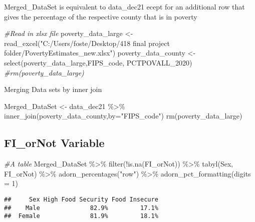 \documentclass[
]{article}
\newenvironment{Shaded}{\begin{snugshade}}{\end{snugshade}}
\newcommand{\AttributeTok}[1]{\textcolor[rgb]{0.77,0.63,0.00}{#1}}
\newcommand{\CommentTok}[1]{\textcolor[rgb]{0.56,0.35,0.01}{\textit{#1}}}
\newcommand{\DecValTok}[1]{\textcolor[rgb]{0.00,0.00,0.81}{#1}}
\newcommand{\FunctionTok}[1]{\textcolor[rgb]{0.00,0.00,0.00}{#1}}
\newcommand{\NormalTok}[1]{#1}
\newcommand{\OtherTok}[1]{\textcolor[rgb]{0.56,0.35,0.01}{#1}}
\newcommand{\SpecialCharTok}[1]{\textcolor[rgb]{0.00,0.00,0.00}{#1}}
\newcommand{\StringTok}[1]{\textcolor[rgb]{0.31,0.60,0.02}{#1}}
\begin{document}
Merged\_DataSet is equivalent to data\_dec21 ecept for an additional row
that gives the percentage of the respective county that is in poverty

\begin{Shaded}
\begin{Highlighting}[]
\CommentTok{\#Read in xlsx file}
\NormalTok{poverty\_data\_large }\OtherTok{\textless{}{-}} \FunctionTok{read\_excel}\NormalTok{(}\StringTok{"C:/Users/foste/Desktop/418 final project folder/PovertyEstimates\_new.xlsx"}\NormalTok{)}
\NormalTok{poverty\_data\_county }\OtherTok{\textless{}{-}} \FunctionTok{select}\NormalTok{(poverty\_data\_large,FIPS\_code, PCTPOVALL\_2020)}
\CommentTok{\#rm(poverty\_data\_large)}
\end{Highlighting}
\end{Shaded}

Merging Data sets by inner join

\begin{Shaded}
\begin{Highlighting}[]
\NormalTok{Merged\_DataSet }\OtherTok{\textless{}{-}}\NormalTok{  data\_dec21 }\SpecialCharTok{\%\textgreater{}\%} \FunctionTok{inner\_join}\NormalTok{(poverty\_data\_county,}\AttributeTok{by=}\StringTok{"FIPS\_code"}\NormalTok{)}
\FunctionTok{rm}\NormalTok{(poverty\_data\_large)}
\end{Highlighting}
\end{Shaded}

\hypertarget{fi_ornot-variable}{%
\subsection{FI\_orNot Variable}\label{fi_ornot-variable}}

\begin{Shaded}
\begin{Highlighting}[]
\CommentTok{\#A table }
\NormalTok{Merged\_DataSet }\SpecialCharTok{\%\textgreater{}\%} \FunctionTok{filter}\NormalTok{(}\SpecialCharTok{!}\FunctionTok{is.na}\NormalTok{(FI\_orNot)) }\SpecialCharTok{\%\textgreater{}\%} 
\FunctionTok{tabyl}\NormalTok{(Sex, FI\_orNot) }\SpecialCharTok{\%\textgreater{}\%} 
  \FunctionTok{adorn\_percentages}\NormalTok{(}\StringTok{"row"}\NormalTok{) }\SpecialCharTok{\%\textgreater{}\%} 
  \FunctionTok{adorn\_pct\_formatting}\NormalTok{(}\AttributeTok{digits =} \DecValTok{1}\NormalTok{)}
\end{Highlighting}
\end{Shaded}

\begin{verbatim}
##     Sex High Food Security Food Insecure
##    Male              82.9%         17.1%
##  Female              81.9%         18.1%
\end{verbatim}
\end{document}
